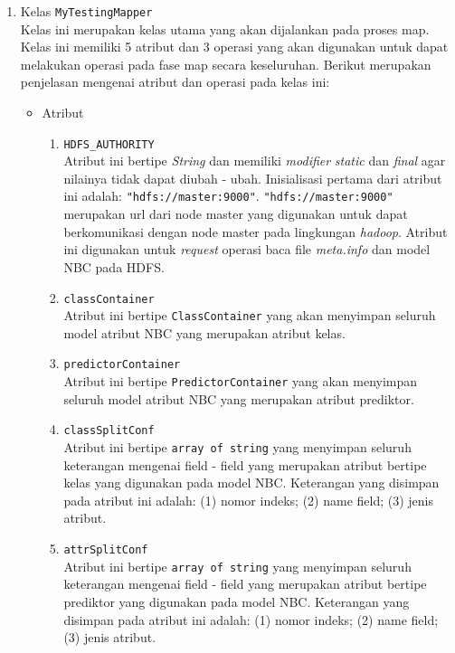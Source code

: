 \begin{enumerate}
	\item{Kelas \texttt{MyTestingMapper}}\\
	Kelas ini merupakan kelas utama yang akan dijalankan pada proses map. Kelas ini memiliki 5 atribut dan 3 operasi yang akan digunakan untuk dapat melakukan operasi pada fase map secara keseluruhan. Berikut merupakan penjelasan mengenai atribut dan operasi pada kelas ini:
	\begin{itemize}
		\item{Atribut}
		\begin{enumerate}
			\item{\verb|HDFS_AUTHORITY|}\\
		Atribut ini bertipe \textit{String} dan memiliki \textit{modifier} \textit{static} dan \textit{final} agar nilainya tidak dapat diubah - ubah. Inisialisasi pertama dari atribut ini adalah: \verb|"hdfs://master:9000"|. \verb|"hdfs://master:9000"| merupakan url dari node master yang digunakan untuk dapat berkomunikasi dengan node master pada lingkungan \textit{hadoop}. Atribut ini digunakan untuk \textit{request} operasi baca file \textit{meta.info} dan model NBC pada HDFS.
		
		\item{\texttt{classContainer}}\\
		Atribut ini bertipe \texttt{ClassContainer} yang akan menyimpan seluruh model atribut NBC yang merupakan atribut kelas. 

		\item{\texttt{predictorContainer}}\\
		Atribut ini bertipe \texttt{PredictorContainer} yang akan menyimpan seluruh model atribut NBC yang merupakan atribut prediktor. 

		\item{\texttt{classSplitConf}}\\
		Atribut ini bertipe \texttt{array of string} yang menyimpan seluruh keterangan mengenai field - field yang merupakan atribut bertipe kelas yang digunakan pada model NBC. Keterangan yang disimpan pada atribut ini adalah: (1) nomor indeks; (2) name field; (3) jenis atribut. 

		\item{\texttt{attrSplitConf}}\\
		Atribut ini bertipe \texttt{array of string} yang menyimpan seluruh keterangan mengenai field - field yang merupakan atribut bertipe prediktor yang digunakan pada model NBC. Keterangan yang disimpan pada atribut ini adalah: (1) nomor indeks; (2) name field; (3) jenis atribut.
		

\end{enumerate}
\end{itemize}
\end{enumerate}
